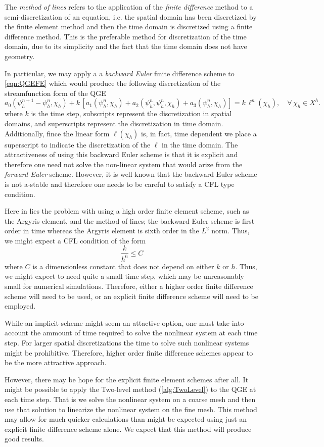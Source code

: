 The \emph{method of lines} refers to the application of the \emph{finite difference} method to a
semi-discretization of an equation, i.e. the spatial domain has been discretized by the finite
element method and then the time domain is discretized using a finite difference method. This is the
preferable method for discretization of the time domain, due to its simplicity and the fact that the
time domain does not have geometry.

In particular, we may apply a a \emph{backward Euler} finite difference scheme to \eqref{eqn:QGEFE}
which would produce the following discretization of the streamfunction form of the QGE
\begin{equation}
  a_0(\psi_h^{n+1} - \psi_h^n, \chi_h) + k\, \left[a_1(\psi_h^n,\chi_h) + a_2(\psi_h^n,\psi_h^n,\chi_h)
      + a_3(\psi_h^n,\chi_h)\right] = k\, \ell^n(\chi_h),\quad \forall \, \chi_h \in X^h.
  \label{eqn:BEQGE}
\end{equation}
where $k$ is the time step, subscripts represent the discretization in spatial domains, and
superscripts represent the discretization in time domain. Additionally, fince the linear form
$\ell(\chi_h)$ is, in fact, time dependent we place a superscript to indicate the discretization of
the $\ell$ in the time domain.  The attractiveness of using this backward Euler scheme is that it is
explicit and therefore one need not solve the non-linear system that would arize from the
\emph{forward Euler} scheme. However, it is well known that the backward Euler scheme is not
a-stable and therefore one needs to be careful to satisfy a CFL type condition.

Here in lies the problem with using a high order finite element scheme, such as the Argyris element,
and the method of lines; the backward Euler scheme is first order in time whereas the Argyris
element is sixth order in the $L^2$ norm. Thus, we might expect a CFL condition of the form
\begin{equation*}
  \frac{k}{h^6} \le C
\end{equation*}
where $C$ is a dimensionless constant that does not depend on either $k$ or $h$. Thus, we might
expect to need quite a small time step, which may be unreasonably small for numerical simulations.
Therefore, either a higher order finite difference scheme will need to be used, or an explicit
finite difference scheme will need to be employed. 

While an implicit scheme might seem an attactive option, one must take into account the ammount of
time required to solve the nonlinear system at each time step. For larger spatial discretizations
the time to solve such nonlinear systems might be prohibitive. Therefore, higher order finite
difference schemes appear to be the more attractive approach.

However, there may be hope for the explicit finite element schemes after all. It might be possible
to apply the Two-level method (\autoref{alg:TwoLevel}) to the QGE at each time step. That is we
solve the nonlinear system on a coarse mesh and then use that solution to linearize the nonlinear
system on the fine mesh. This method may allow for much quicker calculations than might be expected
using just an explicit finite difference scheme alone. We expect that this method will produce good
results.
